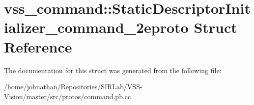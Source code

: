 \hypertarget{structvss__command_1_1StaticDescriptorInitializer__command__2eproto}{}\section{vss\+\_\+command\+:\+:Static\+Descriptor\+Initializer\+\_\+command\+\_\+2eproto Struct Reference}
\label{structvss__command_1_1StaticDescriptorInitializer__command__2eproto}


The documentation for this struct was generated from the following file\+:\begin{DoxyCompactItemize}
\item 
/home/johnathan/\+Repositories/\+S\+I\+R\+Lab/\+V\+S\+S-\/\+Vision/master/src/protos/command.\+pb.\+cc\end{DoxyCompactItemize}
